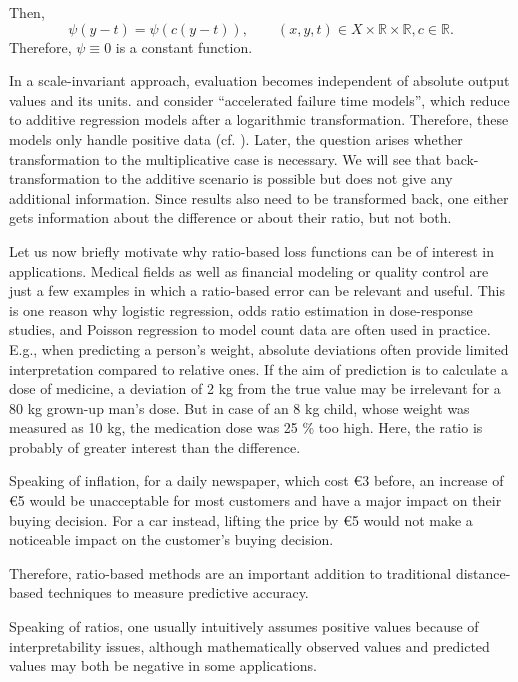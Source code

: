 \documentclass[10pt]{article}
\newcommand{\anf}[1]{\enquote{#1}}
\newcommand{\R}{\mathbb{R}}
\begin{document}
Then, 
\begin{equation*}
	\psi(y-t) = \psi(c (y-t)) , \qquad (x,y,t) \in X \times \R \times \R, c \in \R.
\end{equation*}
Therefore, $\psi\equiv 0$ is a constant function. \par 
In a scale-invariant approach, evaluation becomes independent of absolute output values and its units.
\cite[(2)]{ChenEtAl2010LARE} and \cite[(1)]{ChenEtAl2016LPRE} consider \anf{accelerated failure time models}, which reduce to additive regression models after a logarithmic transformation.
Therefore, these models only handle positive data (cf. \cite[p. 2]{ChenEtAl2010LARE}).
Later, the question arises whether transformation to the multiplicative case is necessary. 
We will see that back-transformation to the additive scenario is possible but does not give any additional information. 
Since results also need to be transformed back, one either gets information about the difference or about their ratio, but not both. \par 
Let us now briefly motivate why ratio-based loss functions can be of interest in applications. Medical fields as well as financial modeling or quality control are just a few examples in which a ratio-based error can be relevant and useful. This is one reason why logistic regression, odds ratio estimation  in dose-response studies, and Poisson regression to model count data are often used in practice.
E.g., when predicting a person's weight, absolute deviations often provide limited interpretation compared to relative ones.
If the aim of prediction is to calculate a dose of medicine, a deviation of 2 kg from the true value may be irrelevant for a 80 kg grown-up man's dose. But in case of an 8 kg child, whose weight was measured as 10 kg, the medication dose was 25 \% too high.
Here, the ratio is probably of greater interest than the difference. \par 
Speaking of inflation, for a daily newspaper, which cost \euro 3 before, an increase of \euro 5 would be unacceptable for most customers and have a major impact on their buying decision.
For a car instead, lifting the price by \euro 5 would not make a noticeable impact on the customer's buying decision. \par	
Therefore, ratio-based methods are an important addition to traditional distance-based techniques to measure predictive accuracy.\par 
Speaking of ratios, one usually intuitively assumes positive values because of interpretability issues, although mathematically observed values and predicted values may both be negative in some applications. 
\end{document}
